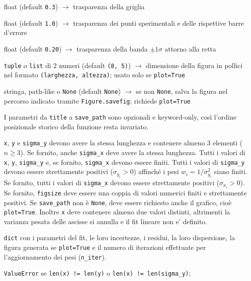 \begin{apidesc}
\begin{description}[font=\normalfont\ttfamily\bfseries, labelwidth=7em, leftmargin=7.5em, itemsep=1pt, parsep=0pt, topsep=3pt]
      \item[grid\_alpha] float (default \texttt{0.3}) $\to$ trasparenza della griglia
      \item[data\_alpha] float (default \texttt{1.0}) $\to$ trasparenza dei punti sperimentali e delle rispettive barre d'errore
      \item[std\_alpha] float (default \texttt{0.20}) $\to$ trasparenza della banda $\pm 1\sigma$ attorno alla retta
      \item[figsize] \texttt{tuple} o \texttt{list} di 2 numeri (default \texttt{(8, 5)}) $\to$ dimensione della figura in pollici nel formato \texttt{(larghezza, altezza)}; usato solo se \texttt{plot=True}
      \item[save\_path] stringa, path-like o \texttt{None} (default \texttt{None}) $\to$ se non \texttt{None}, salva la figura nel percorso indicato tramite \texttt{Figure.savefig}; richiede \texttt{plot=True}
    \end{description}
    I parametri da \texttt{title} a \texttt{save\_path} sono opzionali e keyword-only, così l'ordine posizionale storico della funzione resta invariato.
    \vspace{-3pt}
  \item[\textbf{Vincoli}]
    \texttt{x}, \texttt{y} e \texttt{sigma\_y} devono avere la stessa lunghezza e contenere almeno 3 elementi ($n \geq 3$). Se fornito, anche \texttt{sigma\_x} deve avere la stessa lunghezza.
    Tutti i valori di \texttt{x}, \texttt{y}, \texttt{sigma\_y} e, se fornito, \texttt{sigma\_x} devono essere finiti.
    Tutti i valori di \texttt{sigma\_y} devono essere strettamente positivi ($\sigma_{y_i} > 0$) affinché i pesi $w_i = 1/\sigma_{y_i}^2$ siano finiti. Se fornito, tutti i valori di \texttt{sigma\_x} devono essere strettamente positivi ($\sigma_{x_i} > 0$).
    Se fornito, \texttt{figsize} deve essere una coppia di valori numerici finiti e strettamente positivi.
    Se \texttt{save\_path} non è \texttt{None}, deve essere richiesto anche il grafico, cioè \texttt{plot=True}.
    Inoltre \texttt{x} deve contenere almeno due valori distinti, altrimenti la varianza pesata delle ascisse si annulla e il fit lineare non e' definito.
  \item[\textbf{Restituisce}]
    \texttt{dict} con i parametri del fit, le loro incertezze, i residui, la loro dispersione, la figura generata se \texttt{plot=True} e il numero di iterazioni effettuate per l'aggiornamento dei pesi (\texttt{n\_iter}).
  \item[\textbf{Eccezioni}]
    \texttt{ValueError} se \texttt{len(x) != len(y)} o \texttt{len(x) != len(sigma\_y)};

\end{apidesc}
